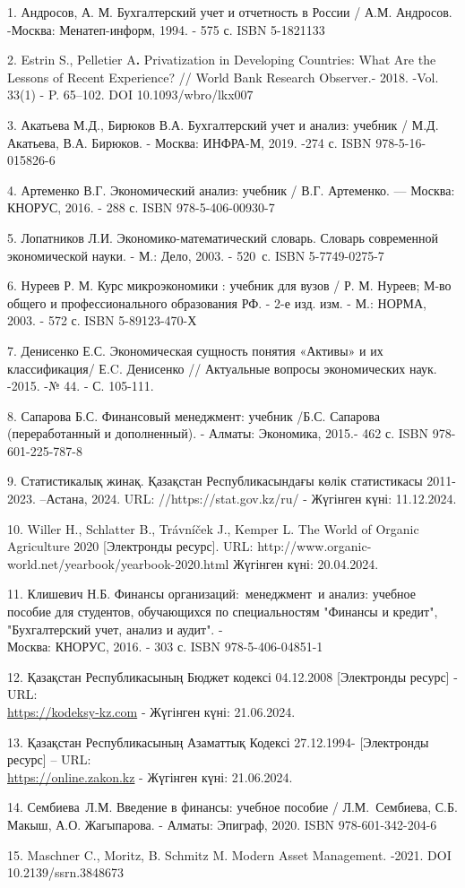\begin{references}
1. Андросов, А. М. Бухгалтерский учет и отчетность в России / А.М.
Андросов. -Москва: Менатеп-информ, 1994. - 575 с. ISBN 5-1821133

2. Estrin S., Pelletier A{\bfseries .} Privatization in Developing
Countries: What Are the Lessons of Recent Experience? // World Bank
Research Observer.- 2018. -Vol. 33(1) - P. 65--102.
DOI 10.1093/wbro/lkx007

3. Акатьева М.Д., Бирюков В.А. Бухгалтерский учет и анализ: учебник /
М.Д. Акатьева, В.А. Бирюков. - Москва: ИНФРА-М, 2019. -274 с. ISBN
978-5-16-015826-6

4. Артеменко В.Г. Экономический анализ: учебник / В.Г. Артеменко. ---
Москва: КНОРУС, 2016. - 288 с. ISBN 978-5-406-00930-7

5. Лопатников Л.И. Экономико-математический словарь. Словарь современной
экономической науки. - М.: Дело, 2003. - 520~с. ISBN 5-7749-0275-7

6. Нуреев Р. М. Курс микроэкономики : учебник для вузов / Р. М. Нуреев;
М-во общего и профессионального образования РФ. - 2-е изд. изм. - М.:
НОРМА, 2003. - 572 с. ISBN 5-89123-470-Х

7. Денисенко Е.С. Экономическая сущность понятия «Активы» и их
классификация/ Е.C. Денисенко // Актуальные вопросы экономических
наук. -2015. -№ 44. - С. 105-111.

8. Сапарова Б.С. Финансовый менеджмент: учебник /Б.С. Сапарова
(переработанный и дополненный). - Алматы: Экономика, 2015.- 462 с.
ISBN 978-601-225-787-8

9. Статистикалық жинақ. Қазақстан Республикасындағы көлік статистикасы
2011-2023. --Астана, 2024. URL: //https://stat.gov.kz/ru/ - Жүгінген
күні: 11.12.2024.

10. Willer H., Schlatter B., Trávníček J., Kemper L. The World of Organic
Agriculture 2020 {[}Электронды ресурс{]}. URL:
http://www.organic-world.net/yearbook/yearbook-2020.html Жүгінген
күні: 20.04.2024.

11. Клишевич Н.Б. Финансы организаций:~менеджмент~и анализ: учебное
пособие для студентов, обучающихся по специальностям "Финансы и
кредит", "Бухгалтерский учет, анализ и аудит". - \\Москва: КНОРУС, 2016.
- 303 с. ISBN 978-5-406-04851-1

12. Қазақстан Республикасының Бюджет кодексі 04.12.2008 {[}Электронды
ресурс{]} - URL:\\
\href{https://kodeksy-kz.com/ka/dictionary/b/byudzhetnye_sredstva}{https://kodeksy-kz.com} -
Жүгінген күні: 21.06.2024.

13. Қазақстан Республикасының Азаматтық Кодексі 27.12.1994- {[}Электронды
ресурс{]} -- URL:\\
\href{https://online.zakon.kz/Document/?doc\%20_id=51006061}{https://online.zakon.kz}
- Жүгінген күні: 21.06.2024.

14. Сембиева~Л.М. Введение в финансы: учебное пособие / Л.М.~Сембиева,
С.Б. Макыш, А.О. Жагыпарова. - Алматы: Эпиграф, 2020. ISBN
978-601-342-204-6

15. Maschner C., Moritz, B. Schmitz M. Modern Asset Management. -2021. DOI
10.2139/ssrn.3848673
\end{references}

